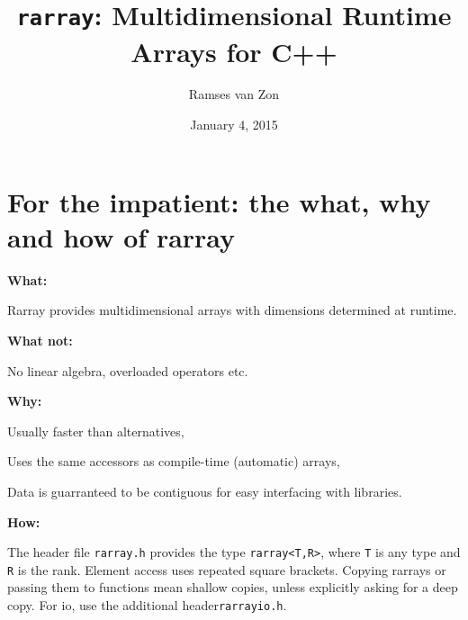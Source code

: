 \documentclass[11pt,twoside]{article}
\newcommand{\cxx}{C{++}}
\begin{document}
\setlength{\parskip}{1mm}

\title{\texttt{rarray}: Multidimensional Runtime Arrays for \cxx}

\author{Ramses van Zon%
\vspace{-8pt}} 

\date{January 4, 2015\vspace{-7mm}}

\maketitle

\section{For the impatient: the what, why and how of rarray}

\noindent\textbf{What:}

Rarray provides multidimensional arrays with dimensions determined at runtime. 

\noindent\textbf{What not:} 

No linear algebra, overloaded operators etc.

\noindent\textbf{Why:} 

Usually faster than alternatives,

Uses the same accessors as compile-time (automatic) arrays,

Data is guarranteed to be contiguous for easy interfacing with libraries.

\noindent\textbf{How:}

The header file \texttt{rarray.h} provides the type \texttt{rarray<T,R>}, where \texttt{T} is any type and {\tt R} is the rank. Element access uses repeated square brackets. Copying rarrays or passing them to functions mean shallow copies, unless explicitly asking for a deep copy. For io, use the additional header\texttt{rarrayio.h}.

\
\end{document}
